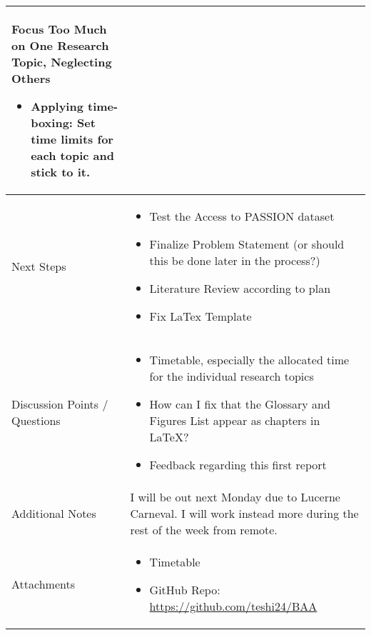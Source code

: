 \documentclass[a4paper,11pt]{article}
\begin{document}
\begin{longtable}{|p{4cm}|p{10cm}|}
		Focus Too Much on One Research Topic, Neglecting Others
		\begin{itemize}
			\item Applying time-boxing: Set time limits for each topic and stick to it.
		\end{itemize} \\
		
		\hline
		Next Steps & \begin{itemize}
			\item Test the Access to PASSION dataset
			\item Finalize Problem Statement (or should this be done later in the process?)
			\item Literature Review according to plan
			\item Fix LaTex Template
		\end{itemize} \\
		\hline
		Discussion Points / Questions & \begin{itemize}
			\item Timetable, especially the allocated time for the individual research topics
			\item How can I fix that the Glossary and Figures List appear as chapters in LaTeX?
			\item Feedback regarding this first report
		\end{itemize} \\
		\hline
		Additional Notes & I will be out next Monday due to Lucerne Carneval. I will work instead more during the rest of the week from remote. \\
		\hline
		Attachments  & \begin{itemize}
			\item Timetable
			\item GitHub Repo: \href{https://github.com/teshi24/BAA}{https://github.com/teshi24/BAA}
		\end{itemize} \\
		\hline
	\end{longtable}
	
\end{document}
